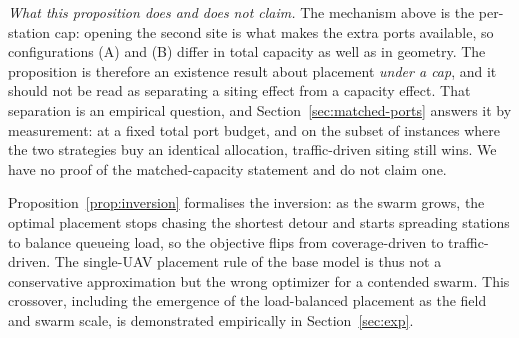 \noindent
\emph{What this proposition does and does not claim.} The mechanism above is the
per-station cap: opening the second site is what makes the extra ports available, so
configurations (A) and (B) differ in total capacity as well as in geometry. The
proposition is therefore an existence result about placement \emph{under a cap}, and it
should not be read as separating a siting effect from a capacity effect. That separation
is an empirical question, and Section~\ref{sec:matched-ports} answers it by measurement:
at a fixed total port budget, and on the subset of instances where the two strategies buy
an identical allocation, traffic-driven siting still wins. We have no proof of the
matched-capacity statement and do not claim one.

\noindent
Proposition~\ref{prop:inversion} formalises the inversion: as the swarm grows, the
optimal placement stops chasing the shortest detour and starts spreading stations
to balance queueing load, so the objective flips from coverage-driven to
traffic-driven. The single-UAV placement rule of the base model is thus not a
conservative approximation but the wrong optimizer for a contended swarm. This
crossover, including the emergence of the load-balanced placement as the field and
swarm scale, is demonstrated empirically in Section~\ref{sec:exp}.
